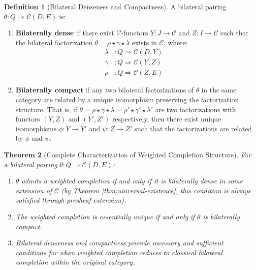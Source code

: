\documentclass[11pt]{article}
\theoremstyle{plain}
\newtheorem{theorem}{Theorem}[section]
\theoremstyle{definition}
\newtheorem{definition}[theorem]{Definition}
\theoremstyle{remark}
\newcommand{\V}{\mathcal{V}}
\newcommand{\C}{\mathcal{C}}
\begin{document}
\begin{definition}[Bilateral Denseness and Compactness]\label{def:bilateral-conditions}
A bilateral pairing $\theta : Q \Rightarrow \C(D, E)$ is:

\begin{enumerate}
\item \textbf{Bilaterally dense} if there exist $\V$-functors $Y : J \to \C$ and $Z : I \to \C$ such that the bilateral factorization $\theta = \rho \star \gamma \star \lambda$ exists in $\C$, where:
\begin{align}
\lambda &: Q \Rightarrow \C(D, Y) \\
\gamma &: Q \Rightarrow \C(Y, Z) \\
\rho &: Q \Rightarrow \C(Z, E)
\end{align}

\item \textbf{Bilaterally compact} if any two bilateral factorizations of $\theta$ in the same category are related by a unique isomorphism preserving the factorization structure. That is, if $\theta = \rho \star \gamma \star \lambda = \rho' \star \gamma' \star \lambda'$ are two factorizations with functors $(Y, Z)$ and $(Y', Z')$ respectively, then there exist unique isomorphisms $\phi : Y \to Y'$ and $\psi : Z \to Z'$ such that the factorizations are related by $\phi$ and $\psi$.
\end{enumerate}
\end{definition}

\begin{theorem}[Complete Characterization of Weighted Completion Structure]\label{thm:bilateral-characterization}
For a bilateral pairing $\theta : Q \Rightarrow \C(D, E)$:

\begin{enumerate}
\item $\theta$ admits a weighted completion if and only if it is bilaterally dense in some extension of $\C$ (by Theorem \ref{thm:universal-existence}, this condition is always satisfied through presheaf extension).

\item The weighted completion is essentially unique if and only if $\theta$ is bilaterally compact.

\item Bilateral denseness and compactness provide necessary and sufficient conditions for when weighted completion reduces to classical bilateral completion within the original category.
\end{enumerate}
\end{theorem}
\end{document}
